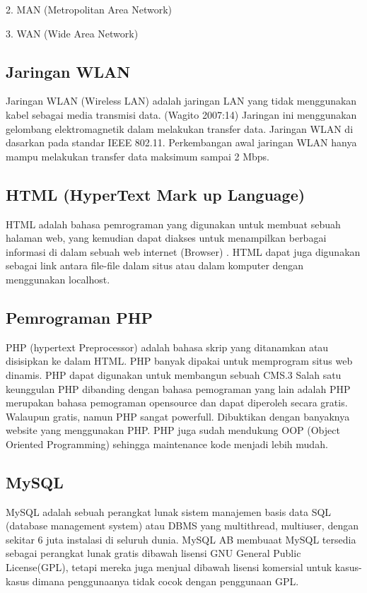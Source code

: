 \documentclass{jtetiproposalskripsi}
\begin{document}
2. MAN (Metropolitan Area Network)

3. WAN (Wide Area Network)

\subsection{Jaringan WLAN}
Jaringan WLAN (Wireless LAN) adalah jaringan LAN yang tidak menggunakan kabel sebagai media transmisi data. (Wagito 2007:14) Jaringan ini menggunakan gelombang elektromagnetik dalam melakukan transfer data. Jaringan WLAN di dasarkan pada standar IEEE 802.11. Perkembangan awal jaringan WLAN hanya mampu melakukan transfer data maksimum sampai 2 Mbps.

\subsection{HTML (HyperText Mark up Language)}
HTML adalah bahasa pemrograman yang digunakan untuk membuat sebuah halaman web, yang kemudian dapat diakses untuk menampilkan berbagai informasi di dalam sebuah web internet (Browser) . HTML dapat juga digunakan sebagai link antara file-file dalam situs atau dalam komputer dengan menggunakan localhost.

\subsection{Pemrograman PHP}
PHP (hypertext Preprocessor) adalah bahasa skrip yang ditanamkan atau disisipkan ke dalam HTML. PHP banyak dipakai untuk memprogram situs web dinamis. PHP dapat digunakan untuk membangun sebuah CMS.3 Salah satu keunggulan PHP dibanding dengan bahasa pemograman yang lain adalah PHP merupakan bahasa pemograman opensource dan dapat diperoleh secara gratis. Walaupun gratis, namun PHP sangat powerfull. Dibuktikan dengan banyaknya website yang menggunakan PHP. PHP juga sudah mendukung OOP (Object Oriented Programming) sehingga maintenance kode menjadi lebih mudah.

\subsection{MySQL}
MySQL adalah sebuah perangkat lunak sistem manajemen basis data SQL (database management system) atau DBMS yang multithread, multiuser, dengan sekitar 6 juta instalasi di seluruh dunia. MySQL AB membuaat MySQL tersedia sebagai perangkat lunak gratis dibawah lisensi GNU General Public License(GPL), tetapi mereka juga menjual dibawah lisensi komersial untuk kasus-kasus dimana penggunaanya tidak cocok dengan penggunaan GPL.
\end{document}
